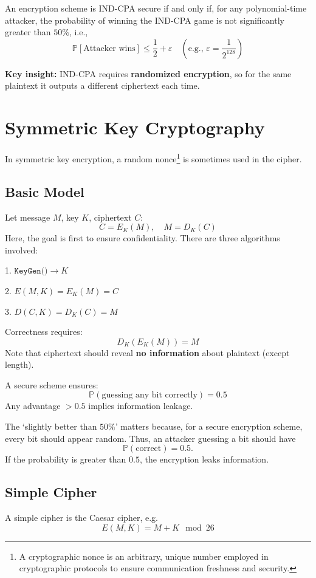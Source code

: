 An encryption scheme is IND-CPA secure if and only if, for any polynomial-time attacker, the probability of winning the IND-CPA game is not significantly greater than \(50\%\), i.e.,
\[
  \mathbb{P}[\text{Attacker wins}] \leq \frac{1}{2} + \varepsilon \quad (\text{e.g., } \varepsilon = \frac{1}{2^{128}})
\]

\textbf{Key insight:} IND-CPA requires \textbf{randomized encryption}, so for the same plaintext it outputs a different ciphertext each time.

\section{Symmetric Key Cryptography}

In symmetric key encryption, a random nonce\footnote{A cryptographic nonce is an arbitrary, unique number employed in cryptographic protocols to ensure communication freshness and security.} is sometimes used in the cipher.

\subsection{Basic Model}
Let message \(M\), key \(K\), ciphertext \(C\):
\[
  C = E_K(M), \quad M = D_K(C)
\]
Here, the goal is first to ensure confidentiality. There are three algorithms involved:

1. \(\texttt{KeyGen()} \to K\)

2. \(E(M, K) = E_K(M) = C\)

3. \(D(C, K) = D_K(C) = M\)

Correctness requires:
\[
  D_K(E_K(M)) = M
\]
Note that ciphertext should reveal \textbf{no information} about plaintext (except length).

A secure scheme ensures:
\[
\mathbb{P}(\text{guessing any bit correctly}) = 0.5
\]
Any advantage \(> 0.5\) implies information leakage.

\begin{remark}
  The `slightly better than \(50\%\)' matters because, for a secure encryption scheme, every bit should appear random. Thus, an attacker guessing a bit should have
  \[
    \mathbb{P}(\text{correct}) = 0.5.
  \]
  If the probability is greater than \(0.5\), the encryption leaks information.
\end{remark}

\subsection{Simple Cipher}
A simple cipher is the Caesar cipher, e.g.
\[
  E(M,K) = M + K \mod 26
\]

